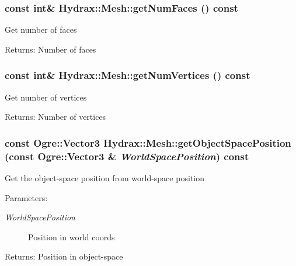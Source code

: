 \begin{CompactItemize}
{\subsubsection[{getNumFaces}]{\setlength{\rightskip}{0pt plus 5cm}const int\& Hydrax::Mesh::getNumFaces () const}}
\label{class_hydrax_1_1_mesh_d3b37eaa18198d3f4690bf17877bd61f}


Get number of faces \begin{Desc}
\item[Returns:]Number of faces \end{Desc}
\hypertarget{class_hydrax_1_1_mesh_ecea28be3ab15b9003565e463f2484e8}{
\subsubsection[{getNumVertices}]{\setlength{\rightskip}{0pt plus 5cm}const int\& Hydrax::Mesh::getNumVertices () const}}
\label{class_hydrax_1_1_mesh_ecea28be3ab15b9003565e463f2484e8}


Get number of vertices \begin{Desc}
\item[Returns:]Number of vertices \end{Desc}
\hypertarget{class_hydrax_1_1_mesh_999d2b1a4ce0ccc1b23ebe80541e4a97}{
\subsubsection[{getObjectSpacePosition}]{\setlength{\rightskip}{0pt plus 5cm}const Ogre::Vector3 Hydrax::Mesh::getObjectSpacePosition (const Ogre::Vector3 \& {\em WorldSpacePosition}) const}}
\label{class_hydrax_1_1_mesh_999d2b1a4ce0ccc1b23ebe80541e4a97}


Get the object-space position from world-space position \begin{Desc}
\item[Parameters:]
\begin{description}
\item[{\em WorldSpacePosition}]Position in world coords \end{description}
\end{Desc}
\begin{Desc}
\item[Returns:]Position in object-space \end{Desc}
\hypertarget{class_hydrax_1_1_mesh_691d01cdbb82e5d3cd92397fd17d97f6}{
}
\end{CompactItemize}
